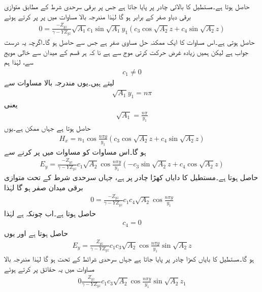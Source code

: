 حاصل ہوتا ہے۔مستطیل کا بالائی چادر  پر پایا جاتا ہے جس پر برقی سرحدی شرط کے مطابق متوازی برقی دباو صفر کے برابر ہو گا لہٰذا مندرجہ بالا مساوات میں  پر  پر کرتے ہوئے
\begin{align*}
0=\frac{-Z_{yz}}{\gamma-Y Z_{yz}} \sqrt{A_1}c_1 \sin \sqrt{A_1} y_1 \left(c_3 \cos \sqrt{A_2} z + c_4 \sin \sqrt{A_2} z\right)
\end{align*}
حاصل ہوتی ہے۔اس مساوات کا ایک ممکنہ حل  مساوی صفر ہے جس سے  حاصل ہو گا۔اگرچہ یہ درست جواب ہے لیکن ہمیں زیادہ غرض حرکت کرتی موج سے ہے نا کہ ہر قسم کے میدان سے خالی مویج سے، لہٰذا ہم 
\begin{align}
c_1 \ne 0
\end{align}
لیتے ہیں۔یوں مندرجہ بالا مساوات سے
\begin{align*}
\sqrt{A_1} y_1 = n \pi
\end{align*}
یعنی
\begin{align}\label{مساوات_مویج_عمومی_حل_پہلا_مستقل}
\sqrt{A_1}=\frac{n \pi}{y_1}
\end{align}
حاصل ہوتا ہے جہاں  ممکن ہے۔یوں
\begin{align}\label{مساوات_مویج_موج_حل_ٹ}
H_x=n_1 \cos \frac{n \pi y}{y_1} \left(c_3 \cos \sqrt{A_2} z + c_4 \sin \sqrt{A_2} z\right)
\end{align}
ہو گا۔اس مساوات کو مساوات  میں پر کرنے سے
\begin{align*}
E_y=\frac{-Z_{yz}}{\gamma-Y Z_{yz}}c_1 \sqrt{A_2}\cos \frac{n \pi y}{y_1} \left(-c_3 \sin \sqrt{A_2} z + c_4 \cos \sqrt{A_2} z\right)
\end{align*}
حاصل ہوتا ہے۔مستطیل کا دایاں کھڑا چادر  پر ہے، جہاں سرحدی شرط کے تحت متوازی برقی میدان صفر ہو گا لہٰذا
\begin{align*}
0=\frac{-Z_{yz}}{\gamma-Y Z_{yz}}c_1 c_4 \sqrt{A_2}\cos \frac{n \pi y}{y_1}  
\end{align*}
حاصل ہوتا ہے۔اب چونکہ  ہے لہٰذا
\begin{align}
c_4=0
\end{align}
حاصل ہوتا ہے اور یوں
\begin{align*}
E_y=\frac{Z_{yz}}{\gamma-Y Z_{yz}}c_1 c_3 \sqrt{A_2}\cos \frac{n \pi y}{y_1} \sin \sqrt{A_2} z
\end{align*}
ہو گا۔مستطیل کا بایاں کھڑا چادر  پر پایا جاتا ہے جہاں سرحدی شرائط کے تحت  ہو گا لہٰذا مندرجہ بالا مساوات میں یہ حقائق پر کرتے ہوئے
\begin{align*}
0\frac{Z_{yz}}{\gamma-Y Z_{yz}}c_1 c_3 \sqrt{A_2}\cos \frac{n \pi y}{y_1} \sin \sqrt{A_2} z_1
\end{align*}
